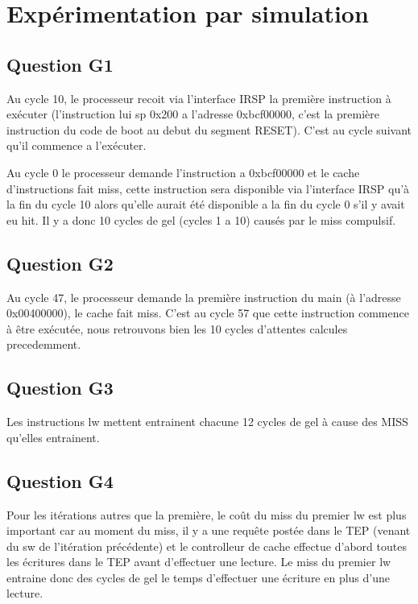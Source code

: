 \documentclass{article}
\begin{document}
\section{Expérimentation par simulation}

\subsection{Question G1}

Au cycle 10, le processeur recoit via l'interface IRSP la première instruction
à exécuter (l'instruction lui sp 0x200 a l'adresse 0xbcf00000, c'est la
première instruction du code de boot au debut du segment RESET).
C'est au cycle suivant qu'il commence a l'exécuter.

Au cycle 0 le processeur demande l'instruction a 0xbcf00000 et le cache
d'instructions fait miss, cette instruction sera disponible via l'interface IRSP
qu'à la fin du cycle 10 alors qu'elle aurait été disponible a la fin du cycle 0
s'il y avait eu hit. Il y a donc 10 cycles de gel (cycles 1 a 10) causés par
le miss compulsif.

\subsection{Question G2}

Au cycle 47, le processeur demande la première instruction du main
(à l'adresse 0x00400000),
le cache fait miss. C'est au cycle 57 que cette instruction commence à être
exécutée,
nous retrouvons bien les 10 cycles d'attentes calcules precedemment.

\subsection{Question G3}

Les instructions lw mettent entrainent chacune 12 cycles de gel à cause des
MISS qu'elles entrainent.

\subsection{Question G4}

Pour les itérations autres que la première, le coût du miss du premier lw
est plus important car au moment du miss, il y a une requête postée dans le 
TEP (venant du sw de l'itération précédente) et le controlleur de cache
effectue d'abord toutes les écritures dans le TEP avant d'effectuer une lecture.
Le miss du premier lw entraine donc des cycles de gel le temps d'effectuer
une écriture en plus d'une lecture.



\end{document}
